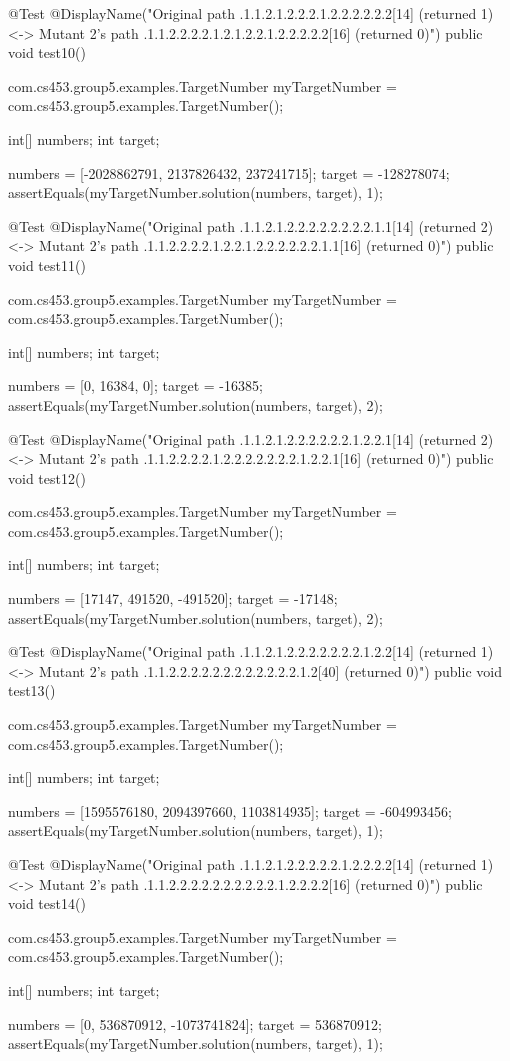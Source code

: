 @Test
@DisplayName("Original path .1.1.2.1.2.2.2.1.2.2.2.2.2.2[14] (returned 1) <-> Mutant 2's path .1.1.2.2.2.2.1.2.1.2.2.1.2.2.2.2.2[16] (returned 0)")
public void test10() {
    com.cs453.group5.examples.TargetNumber myTargetNumber = com.cs453.group5.examples.TargetNumber();

    int[] numbers;
    int target;

    numbers = [-2028862791, 2137826432, 237241715];
    target = -128278074;
    assertEquals(myTargetNumber.solution(numbers, target), 1);
}

@Test
@DisplayName("Original path .1.1.2.1.2.2.2.2.2.2.2.2.1.1[14] (returned 2) <-> Mutant 2's path .1.1.2.2.2.2.1.2.2.1.2.2.2.2.2.2.1.1[16] (returned 0)")
public void test11() {
    com.cs453.group5.examples.TargetNumber myTargetNumber = com.cs453.group5.examples.TargetNumber();

    int[] numbers;
    int target;

    numbers = [0, 16384, 0];
    target = -16385;
    assertEquals(myTargetNumber.solution(numbers, target), 2);
}

@Test
@DisplayName("Original path .1.1.2.1.2.2.2.2.2.2.1.2.2.1[14] (returned 2) <-> Mutant 2's path .1.1.2.2.2.2.1.2.2.2.2.2.2.2.1.2.2.1[16] (returned 0)")
public void test12() {
    com.cs453.group5.examples.TargetNumber myTargetNumber = com.cs453.group5.examples.TargetNumber();

    int[] numbers;
    int target;

    numbers = [17147, 491520, -491520];
    target = -17148;
    assertEquals(myTargetNumber.solution(numbers, target), 2);
}

@Test
@DisplayName("Original path .1.1.2.1.2.2.2.2.2.2.2.1.2.2[14] (returned 1) <-> Mutant 2's path .1.1.2.2.2.2.2.2.2.2.2.2.2.2.1.2[40] (returned 0)")
public void test13() {
    com.cs453.group5.examples.TargetNumber myTargetNumber = com.cs453.group5.examples.TargetNumber();

    int[] numbers;
    int target;

    numbers = [1595576180, 2094397660, 1103814935];
    target = -604993456;
    assertEquals(myTargetNumber.solution(numbers, target), 1);
}

@Test
@DisplayName("Original path .1.1.2.1.2.2.2.2.2.1.2.2.2.2[14] (returned 1) <-> Mutant 2's path .1.1.2.2.2.2.2.2.2.2.2.2.1.2.2.2.2[16] (returned 0)")
public void test14() {
    com.cs453.group5.examples.TargetNumber myTargetNumber = com.cs453.group5.examples.TargetNumber();

    int[] numbers;
    int target;

    numbers = [0, 536870912, -1073741824];
    target = 536870912;
    assertEquals(myTargetNumber.solution(numbers, target), 1);
}

